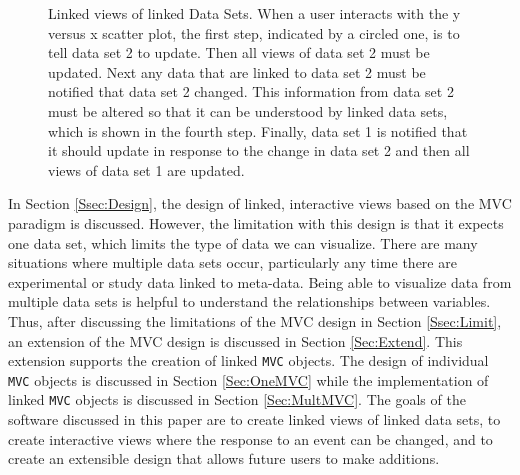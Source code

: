 \documentclass{article}[11pt]
\newcommand{\Robject}[1]{{\texttt{#1}}}
\begin{document}
\begin{figure}[ht]
  \begin{center}
    \caption{ Linked views of linked Data Sets.  When a user interacts with
      the y versus x scatter plot, the first step, indicated by a circled one,
      is to tell data set 2 to update.  Then all views of data set 2 must be
      updated.  Next any data that are linked to data set 2 must be notified
      that data set 2 changed.  This information from data set 2 must be
      altered so that it can be understood by linked data sets, which is shown
      in the fourth step.  Finally, data set 1 is notified that it should
      update in response to the change in data set 2 and then all views of
      data set 1 are updated. }
    \label{Fig:firstMP}
  \end{center}
\end{figure}

In Section \ref{Ssec:Design}, the design of linked, interactive views based on
the MVC paradigm is discussed.  However, the limitation with this design is
that it expects one data set, which limits the type of data we can visualize.
There are many situations where multiple data sets occur, particularly any
time there are experimental or study data linked to meta-data.  Being able to
visualize data from multiple data sets is helpful to understand the
relationships between variables.  Thus, after discussing the limitations of
the MVC design in Section \ref{Ssec:Limit}, an extension of the MVC design is
discussed in Section \ref{Sec:Extend}.  This extension supports the creation of
linked \Robject{MVC} objects.  The design of individual \Robject{MVC} objects
is discussed in 
Section \ref{Sec:OneMVC} while the implementation of linked \Robject{MVC}
objects is discussed in Section \ref{Sec:MultMVC}.  The goals of the software
discussed in this paper are to create linked views of linked data sets, to
create interactive views where the response to an event can be changed, and to
create an extensible design that allows future users to make additions.
\end{document}
